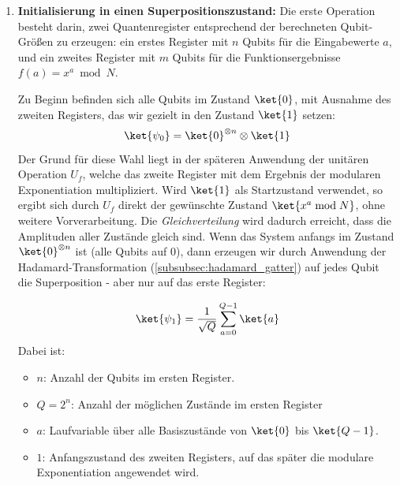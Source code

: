 \begin{enumerate}
    \item \textbf{Initialisierung in einen Superpositionszustand:} 
    Die erste Operation besteht darin, zwei Quantenregister entsprechend der berechneten Qubit-Größen zu erzeugen: ein erstes Register mit \( n \) Qubits für die Eingabewerte \( a \), und ein zweites Register mit \( m \) Qubits für die Funktionsergebnisse \( f(a) = x^a \bmod N \).

    Zu Beginn befinden sich alle Qubits im Zustand \( \ket{0} \), mit Ausnahme des zweiten Registers, das wir gezielt in den Zustand \( \ket{1} \) setzen:
    \[
    \ket{\psi_0} = \ket{0}^{\otimes n} \otimes \ket{1}
    \]
    Der Grund für diese Wahl liegt in der späteren Anwendung der unitären Operation \( U_f \), welche das zweite Register mit dem Ergebnis der modularen Exponentiation multipliziert. Wird \( \ket{1} \) als Startzustand verwendet, so ergibt sich durch \( U_f \) direkt der gewünschte Zustand \( \ket{x^a \bmod N} \), ohne weitere Vorverarbeitung. Die \textit{Gleichverteilung} wird dadurch erreicht, dass die Amplituden aller Zustände gleich sind. Wenn das System anfangs im Zustand $\ket{0}^{\otimes n}$ ist (alle Qubits auf 0), dann erzeugen wir durch Anwendung der Hadamard-Transformation (\ref{subsubsec:hadamard_gatter}) auf jedes Qubit die Superposition - aber nur auf das erste Register:

$$
\ket{\psi_1} = \frac{1}{\sqrt{Q}} \sum_{a=0}^{Q-1} \ket{a}
$$
Dabei ist:
  \begin{itemize}
    \item \( n \): Anzahl der Qubits im ersten Register.
    \item \( Q = 2^n \): Anzahl der möglichen Zustände im ersten Register
    \item \( a \): Laufvariable über alle Basiszustände von \( \ket{0} \) bis \( \ket{Q-1} \).
    \item \( 1 \): Anfangszustand des zweiten Registers, auf das später die modulare Exponentiation angewendet wird.
  \end{itemize}


\end{enumerate}
